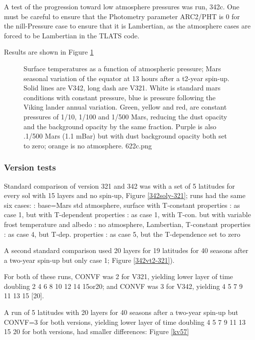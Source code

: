 \documentclass{article}
\begin{document}
A test of the progression toward low atmosphere pressures was run, 342c.  One
must be careful to ensure that the Photometry parameter ARC2/PHT is 0 for the
nill-Pressure case to ensure that it is Lambertian, as the atmosphere cases are
forced to be Lambertian in the TLATS code.

Results are shown in Figure \ref{622c} 
\begin{figure}[!ht] 
\caption [Effect of an atmosphere]{Surface temperatures as a function of
    atmospheric pressure; Mars seasonal variation of the equator at 13 hours
    after a t2-year spin-up. Solid lines are V342, long dash are V321. White is
    standard mars conditions with constant pressure, blue is pressure following
    the Viking lander annual variation. Green, yellow and red, are constant
    pressures of 1/10, 1/100 and 1/500 Mars, reducing the dust opacity and the
    \qcc background opacity by the same fraction.  Purple is also .1/500 Mars
    (1.1 mBar) but with dust \qcc background opacity both set to zero; orange is
    no atmosphere.
\label{622c}  622c.png }
\end{figure} 


\subsubsection{Version tests} %
Standard comparison of version 321 and 342 was with a set of 5 latitudes for
every sol with 15 layers and no spin-up, Figure  \ref{342soly-321}; runs had 
the same six cases:
: base=Mars std atmosphere, surface with T-constant properties
: as case 1, but with T-dependent properties
: as case 1, with T-con. but with variable frost temperature and albedo
: no atmosphere, Lambertian, T-constant properties
: as case 4, but T-dep. properties
: as case 5, but the T-dependence set to zero

A second standard comparison used 20 layers for 19 latitudes for 40 seasons after a two-year spin-up but only case 1; Figure  \ref{342vt2-321}).

For both of these runs,  CONVF was 2 for V321, yielding lower layer of time doubling  2    4    6    8   10   12   14   15or20;  and CONVF was 3 for V342, yielding  4  5  7  9 11 13 15 [20].

A run of 5 latitudes with 20 layers for 40 seasons after a two-year spin-up but 
CONVF=3 for both versions, yielding lower layer of time doubling  4    5    7    9   11   13   15   20 for both versions, had smaller differences: Figure \ref{kv57}
\end{document}
